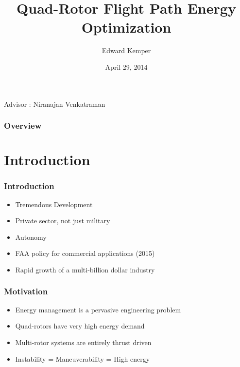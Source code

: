 \documentclass{beamer}
\title[Path-Energy Optimization]{Quad-Rotor Flight Path Energy Optimization}
\author{Edward Kemper} %
\institute[Northern Arizona University]
{
Northern Arizona University \\ %
\medskip
\textit{edwardkemper@gmail.com} %
\medskip
}
\date{April 29, 2014}
\begin{document}
\begin{frame}
\titlepage %
\begin{center}Advisor : Niranajan Venkatraman\end{center}

\end{frame}



\begin{frame}
\frametitle{Overview}
\tableofcontents
\end{frame}


\section{Introduction}

\begin{frame}
\frametitle{Introduction}
\begin{itemize}
\item Tremendous Development
\item Private sector, not just military
\item Autonomy
\item FAA policy for commercial applications (2015)
\item Rapid growth of a multi-billion dollar industry
\end{itemize}
\end{frame}



\begin{frame}
\frametitle{Motivation}
\begin{itemize}
\item Energy management is a pervasive engineering problem
\item Quad-rotors have very high energy demand
\item Multi-rotor systems are entirely thrust driven
\item Instability = Maneuverability = High energy

\end{itemize}
\end{frame}
\end{document}
